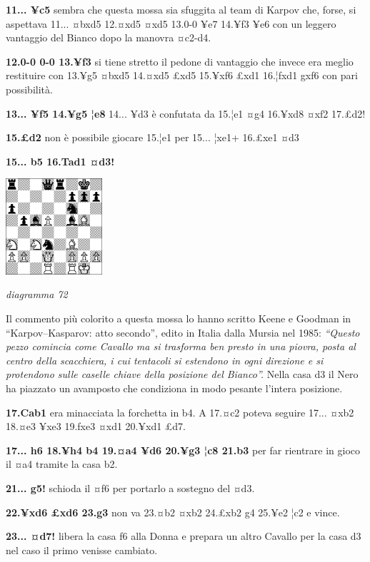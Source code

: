 \documentclass[
]{article}
\begin{document}
\textbf{11... ¥c5} sembra che questa mossa sia sfuggita al team di
Karpov che, forse, si aspettava 11... ¤bxd5 12.¤xd5 ¤xd5 13.0-0 ¥e7
14.¥f3 ¥e6 con un leggero vantaggio del Bianco dopo la manovra ¤c2-d4.

\textbf{12.0-0 0-0 13.¥f3} si tiene stretto il pedone di vantaggio che
invece era meglio restituire con 13.¥g5 ¤bxd5 14.¤xd5 £xd5 15.¥xf6 £xd1
16.¦fxd1 gxf6 con pari possibilità.

\textbf{13... ¥f5 14.¥g5 ¦e8} 14... ¥d3 è confutata da 15.¦e1 ¤g4
16.¥xd8 ¤xf2 17.£d2!

\textbf{15.£d2} non è possibile giocare 15.¦e1 per 15... ¦xe1+ 16.£xe1
¤d3

\textbf{15... b5 16.Tad1 ¤d3!}

\includegraphics[width=1.40139in,height=1.40139in]{vertopal_109f12be458a423d8f3cc838880eaea2/media/image72.png}

\emph{diagramma 72}

Il commento più colorito a questa mossa lo hanno scritto Keene e Goodman
in ``Karpov--Kasparov: atto secondo'', edito in Italia dalla Mursia nel
1985: \emph{``Questo pezzo comincia come Cavallo ma si trasforma ben
presto in una piovra, posta al centro della scacchiera, i cui tentacoli
si estendono in ogni direzione e si protendono sulle caselle chiave
della posizione del Bianco''.} Nella casa d3 il Nero ha piazzato un
avamposto che condiziona in modo pesante l'intera posizione.

\textbf{17.Cab1} era minacciata la forchetta in b4. A 17.¤c2 poteva
seguire 17... ¤xb2 18.¤e3 ¥xe3 19.fxe3 ¤xd1 20.¥xd1 £d7.

\textbf{17... h6 18.¥h4 b4 19.¤a4 ¥d6 20.¥g3 ¦c8 21.b3} per far
rientrare in gioco il ¤a4 tramite la casa b2.

\textbf{21... g5!} schioda il ¤f6 per portarlo a sostegno del ¤d3.

\textbf{22.¥xd6 £xd6 23.g3} non va 23.¤b2 ¤xb2 24.£xb2 g4 25.¥e2 ¦c2 e
vince.

\textbf{23... ¤d7!} libera la casa f6 alla Donna e prepara un altro
Cavallo per la casa d3 nel caso il primo venisse cambiato.
\end{document}
